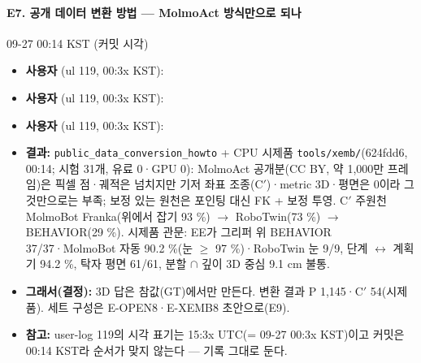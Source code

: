 \paragraph{E7. 공개 데이터 변환 방법 --- MolmoAct 방식만으로 되나}
{\small 09-27 00:14 KST (커밋 시각)}
\begin{itemize}
  \item \textbf{사용자} (ul 119, 00:3x KST): 
  \item \textbf{사용자} (ul 119, 00:3x KST): 
  \item \textbf{사용자} (ul 119, 00:3x KST): 
  \item \textbf{결과:} \texttt{public\_\allowbreak{}data\_\allowbreak{}conversion\_\allowbreak{}howto} + CPU 시제품 \texttt{tools/\allowbreak{}xemb/\allowbreak{}}(624fdd6, 00:14; 시험 31개, 유료 0·GPU 0): MolmoAct 공개분(CC BY, 약 1,000만 프레임)은 픽셀 점·궤적은 넘치지만 기저 좌표 조종(C$'$)·metric 3D·평면은 0이라 그것만으로는 부족; 보정 있는 원천은 포인팅 대신 FK + 보정 투영. C$'$ 주원천 MolmoBot Franka(위에서 잡기 93 \%) $\rightarrow$ RoboTwin(73 \%) $\rightarrow$ BEHAVIOR(29 \%). 시제품 관문: EE가 그리퍼 위 BEHAVIOR 37/37·MolmoBot 자동 90.2 \%(눈 $\geq$ 97 \%)·RoboTwin 눈 9/9, 단계 $\leftrightarrow$ 계획기 94.2 \%, 탁자 평면 61/61, 분할 $\cap$ 깊이 3D 중심 9.1 cm 불통.
  \item \textbf{그래서(결정):} 3D 답은 참값(GT)에서만 만든다. 변환 결과 P 1,145·C$'$ 54(시제품). 세트 구성은 E-OPEN8·E-XEMB8 초안으로(E9).
  \item \textbf{참고:} user-log 119의 시각 표기는 15:3x UTC(= 09-27 00:3x KST)이고 커밋은 00:14 KST라 순서가 맞지 않는다 --- 기록 그대로 둔다.
\end{itemize}

